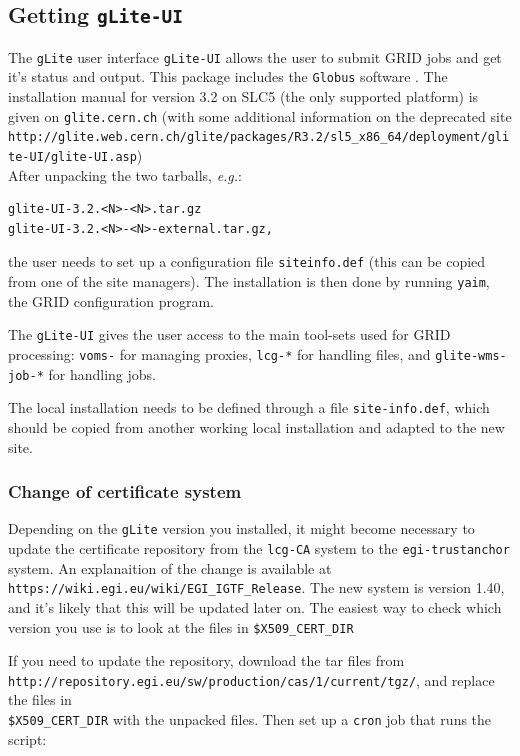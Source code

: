 \documentclass[11pt]{article}
\begin{document}
\subsection{Getting \texttt{gLite-UI}}
The \verb+gLite+ user interface \verb+gLite-UI+ allows the
user to submit GRID jobs and get it's status and output. This package
includes the \verb+Globus+ software \cite{globus}. The installation
manual for version 3.2 on SLC5 (the only supported platform) is given
on \verb+glite.cern.ch+ (with some additional information on the deprecated site \\
\verb+http://glite.web.cern.ch/glite/packages/R3.2/sl5_x86_64/deployment/glite-UI/glite-UI.asp+)\\
After unpacking the two tarballs, \textit{e.g.}:
\begin{verbatim}
glite-UI-3.2.<N>-<N>.tar.gz
glite-UI-3.2.<N>-<N>-external.tar.gz,
\end{verbatim}
the user needs to set
up a configuration file \verb+siteinfo.def+ (this can be copied from
one of the site managers). The installation is then done by running
\verb+yaim+, the GRID configuration program.

The \verb+gLite-UI+ gives the user access to the main tool-sets used
for GRID processing: \verb+voms-+ for managing proxies, \verb+lcg-*+
for handling files, and \verb+glite-wms-job-*+ for handling jobs.

The local installation needs to be defined through a file
\verb+site-info.def+, which should be copied from another working
local installation and adapted to the new site.


\subsubsection{Change of certificate system}
Depending on the \verb+gLite+ version you installed, it might become
necessary to update the certificate repository from the \verb+lcg-CA+
system to the \verb+egi-trustanchor+ system. An explanaition of the
change is available at
\verb+https://wiki.egi.eu/wiki/EGI_IGTF_Release+. The new system is
version 1.40, and it's likely that this will be updated later on. The
easiest way to check which version you use is to look at the files in
\verb+$X509_CERT_DIR+


If you need to update the repository, download the tar files from\\
\verb+http://repository.egi.eu/sw/production/cas/1/current/tgz/+, and
replace the files in\\ \verb+$X509_CERT_DIR+ with the unpacked
files. Then set up a \verb+cron+ job that runs the script:
\end{document}
